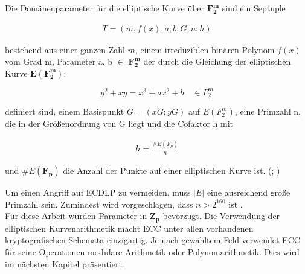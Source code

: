 Die Domänenparameter für die elliptische Kurve über $ \mathbf{ F_2^m } $ sind ein Septuple
\begin{ceqn}
\begin{align*}
           T = (m, f (x), a; b; G; n; h) 
\end{align*}
\end{ceqn}
bestehend aus einer ganzen Zahl $ m $, einem irreduziblen binären Polynom $ f (x) $ vom Grad m, Parameter a, b $ \in $ $ \mathbf{ F_2^m} $ der durch die Gleichung der elliptischen Kurve $ \mathbf{ E (F_2^m)} $:
\begin{ceqn}
\begin{equation}
           y^2 + xy = x^3 + ax^2 + b  \quad \in F_2^m
\end{equation}
\end{ceqn}
definiert sind, einem Basispunkt $ G = (xG; yG) $ auf $ E (F_2^m) $, eine Primzahl n, die in der Größenordnung von G liegt und die Cofaktor h mit 
\begin{ceqn}
 \begin{align*}
   h = \frac{ \#E ({F_p}) }{ n } 
 \end{align*} 
 \end{ceqn}
und $ \#E (\mathbf{F_p}) $  die Anzahl der Punkte auf einer elliptischen Kurve ist. (\cite{standard}; \cite{GaMoDa})


Um einen Angriff auf ECDLP zu vermeiden, muss $ |E| $ eine ausreichend große Primzahl sein. Zumindest wird vorgeschlagen, dass $ n > 2^{160} $ ist \cite{kalsa}.\\


Für diese Arbeit wurden Parameter in $ \mathbf{ Z_p } $ bevorzugt. 
Die Verwendung der elliptischen Kurvenarithmetik macht ECC unter allen vorhandenen kryptografischen Schemata einzigartig.
Je nach gewähltem Feld verwendet ECC für seine Operationen modulare Arithmetik oder Polynomarithmetik. Dies wird im nächsten Kapitel präsentiert. 


